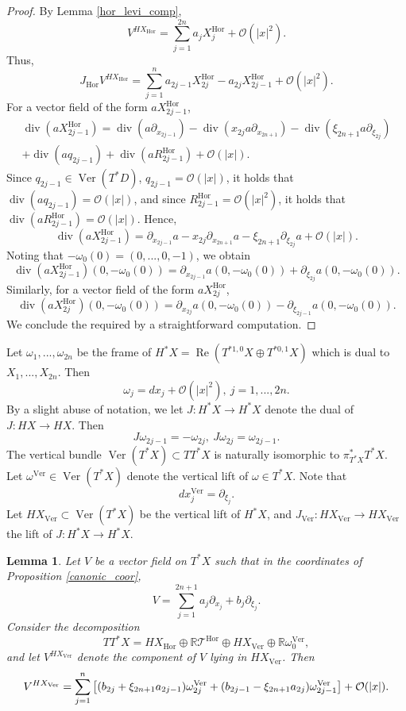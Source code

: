 \documentclass{article}
\newtheorem{lemma}[theorem]{Lemma}
\newcommand{\RR}{\mathbb R}
\newcommand{\mct}{\mathcal T}
\newcommand{\mco}{\mathcal O}
\DeclareMathOperator{\re}{Re}
\DeclareMathOperator{\Div}{div}
\DeclareMathOperator{\Hor}{Hor}
\DeclareMathOperator{\Ver}{Ver}
\begin{document}
\begin{proof}
By Lemma \ref{hor_levi_comp}, $$V^{HX_{\Hor}} = \sum_{j=1}^{2n} a_j X_j^{\Hor} + \mco(|x|^2).$$ Thus, $$J_{\Hor} V^{HX_{\Hor}} = \sum_{j=1}^n a_{2j-1} X_{2j}^{\Hor} - a_{2j} X_{2j-1}^{\Hor} + \mco(|x|^2).$$
For a vector field of the form $a X_{2j-1}^{\Hor}$, \begin{multline*}\Div(a X_{2j-1}^{\Hor}) = \Div(a \partial_{x_{2j-1}}) -\Div(x_{2j} a \partial_{x_{2n+1}}) - \Div(\xi_{2n+1} a \partial_{\xi_{2j}})\\ + \Div(a q_{2j-1}) + \Div(a R_{2j-1}^{\Hor}) + \mco(|x|).\end{multline*}
Since $q_{2j-1} \in \Ver(T^*D)$, $q_{2j-1} = \mco(|x|)$, it holds that $\Div(a q_{2j-1}) = \mco(|x|)$, and since $R_{2j-1}^{\Hor} = \mco(|x|^2)$, it holds that $\Div(a R_{2j-1}^{\Hor}) = \mco(|x|)$. Hence, $$\Div(a X_{2j-1}^{\Hor})= \partial_{x_{2j-1}} a - x_{2j} \partial_{x_{2n+1}} a - \xi_{2n+1} \partial_{\xi_{2j}} a + \mco(|x|).$$
Noting that $-\omega_0(0) = (0, ..., 0, -1)$, we obtain $$\Div(a X_{2j-1}^{\Hor})(0, -\omega_0(0)) = \partial_{x_{2j-1}}a (0, -\omega_0(0)) + \partial_{\xi_{2j}} a(0, -\omega_0(0)).$$
Similarly, for a vector field of the form $a X_{2j}^{\Hor}$, $$\Div(a X_{2j}^{\Hor})(0, -\omega_0(0)) = \partial_{x_{2j}} a(0, -\omega_0(0)) - \partial_{\xi_{2j-1}} a(0, -\omega_0(0)).$$
We conclude the required by a straightforward computation.
%
\end{proof}
%
Let $\omega_1, ..., \omega_{2n}$ be the frame of $H^* X = \re(T^{*1,0}X \oplus T^{*0,1}X)$ which is dual to $X_1,..., X_{2n}$. Then $$\omega_j = dx_j + \mco(|x|^2),\ j = 1,...,2n.$$ By a slight abuse of notation, we let $J : H^* X \to H^*X$ denote the dual of $J : HX \to HX$. Then $$J \omega_{2j-1} = -\omega_{2j},\ J \omega_{2j} = \omega_{2j-1}.$$
%
The vertical bundle $\Ver(T^*X)\subset T T^*X$ is naturally isomorphic to $\pi^*_{T^*X} T^*X$. Let $\omega^{\Ver} \in \Ver(T^*X)$ denote the vertical lift of $\omega \in T^*X$. Note that $$dx_j^{\Ver} = \partial_{\xi_j}.$$
%
Let $H X_{\Ver} \subset \Ver(T^*X)$ be the vertical lift of $H^*X$, and $J_{\Ver} : HX_{\Ver} \to HX_{\Ver}$ the lift of $J : H^*X \to H^*X$. 
%
\begin{lemma} Let $V$ be a vector field on $T^*X$ such that in the coordinates of Proposition \ref{canonic_coor},$$V = \sum_{j=1}^{2n+1} a_j \partial_{x_j} + b_j \partial_{\xi_j}.$$ Consider the decomposition $$T T^*X = HX_{\Hor} \oplus \RR \mct^{\Hor} \oplus HX_{\Ver} \oplus \RR \omega_0^{\Ver},$$
and let $V^{HX_{\Ver}}$ denote the component of $V$ lying in $HX_{\Ver}$. Then \begin{multline*} V^{HX_{\Ver}} = \sum_{j=1}^n \big{[}(b_{2j} + \xi_{2n+1} a_{2j-1}) \omega^{\Ver}_{2j} +(b_{2j-1} - \xi_{2n+1} a_{2j}) \omega_{2j-1}^{\Ver} \big{]} + \mco(|x|).\end{multline*} \end{lemma}
\end{document}
